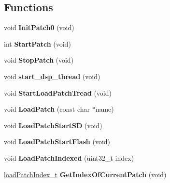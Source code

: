 \subsection*{Functions}
\begin{DoxyCompactItemize}
\item 
void {\bfseries Init\+Patch0} (void)\hypertarget{group__PATCH_gacaf65a01bc5fbb20036c342f1fc1df68}{}\label{group__PATCH_gacaf65a01bc5fbb20036c342f1fc1df68}

\item 
int {\bfseries Start\+Patch} (void)\hypertarget{group__PATCH_gac2f525d3916b8c493cf280bc03b08939}{}\label{group__PATCH_gac2f525d3916b8c493cf280bc03b08939}

\item 
void {\bfseries Stop\+Patch} (void)\hypertarget{group__PATCH_ga97eeb87af0dc8bb629e044b184d614d0}{}\label{group__PATCH_ga97eeb87af0dc8bb629e044b184d614d0}

\item 
void {\bfseries start\+\_\+dsp\+\_\+thread} (void)\hypertarget{group__PATCH_ga00d166568f848217612de350b87990ff}{}\label{group__PATCH_ga00d166568f848217612de350b87990ff}

\item 
void {\bfseries Start\+Load\+Patch\+Tread} (void)\hypertarget{group__PATCH_gaf402e5553e4729d3d028c92ce9349cd6}{}\label{group__PATCH_gaf402e5553e4729d3d028c92ce9349cd6}

\item 
void {\bfseries Load\+Patch} (const char $\ast$name)\hypertarget{group__PATCH_ga8b6cbf23146a3392341c03719c97ca1d}{}\label{group__PATCH_ga8b6cbf23146a3392341c03719c97ca1d}

\item 
void {\bfseries Load\+Patch\+Start\+SD} (void)\hypertarget{group__PATCH_gade941b16ce8691630c9a25ecbf54ecb0}{}\label{group__PATCH_gade941b16ce8691630c9a25ecbf54ecb0}

\item 
void {\bfseries Load\+Patch\+Start\+Flash} (void)\hypertarget{group__PATCH_ga7ea896718ade79254afb6726bcf4d55d}{}\label{group__PATCH_ga7ea896718ade79254afb6726bcf4d55d}

\item 
void {\bfseries Load\+Patch\+Indexed} (uint32\+\_\+t index)\hypertarget{group__PATCH_ga72684c84bfa440a9477f33a16297275d}{}\label{group__PATCH_ga72684c84bfa440a9477f33a16297275d}

\item 
\hyperlink{group__PATCH_ga3bcfa0e2fd6136eb75131fe31d3c0ecf}{load\+Patch\+Index\+\_\+t} {\bfseries Get\+Index\+Of\+Current\+Patch} (void)\hypertarget{group__PATCH_ga29a8bc62e8cb94330b5081ed6fea619d}{}\label{group__PATCH_ga29a8bc62e8cb94330b5081ed6fea619d}


\end{DoxyCompactItemize}
